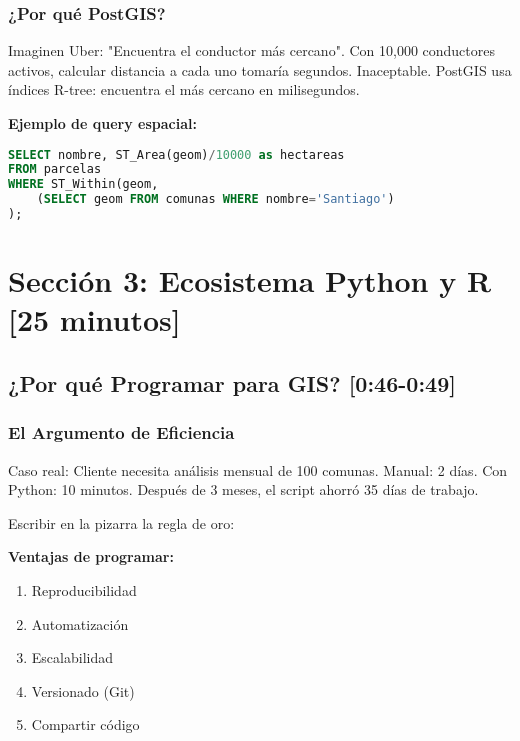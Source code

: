 \documentclass[11pt,a4paper]{article}
\newcommand{\tiempo}[1]{\textcolor{timecolor}{\textbf{[#1]}}}
\newcommand{\decir}[1]{\begin{tcolorbox}[colback=blue!5,colframe=usachblue,title={DECIR}]#1\end{tcolorbox}}
\newcommand{\hacer}[1]{\begin{tcolorbox}[colback=green!5,colframe=green!50!black,title={HACER}]#1\end{tcolorbox}}
\begin{document}
\subsubsection{¿Por qué PostGIS?}

\decir{Imaginen Uber: "Encuentra el conductor más cercano". Con 10,000 conductores activos, calcular distancia a cada uno tomaría segundos. Inaceptable. PostGIS usa índices R-tree: encuentra el más cercano en milisegundos.}

\textbf{Ejemplo de query espacial:}

\begin{lstlisting}[language=SQL]
SELECT nombre, ST_Area(geom)/10000 as hectareas
FROM parcelas
WHERE ST_Within(geom, 
    (SELECT geom FROM comunas WHERE nombre='Santiago')
);
\end{lstlisting}

\newpage

\section{Sección 3: Ecosistema Python y R \tiempo{25 minutos}}

\subsection{¿Por qué Programar para GIS? \tiempo{0:46-0:49}}

\subsubsection{El Argumento de Eficiencia}

\decir{Caso real: Cliente necesita análisis mensual de 100 comunas. Manual: 2 días. Con Python: 10 minutos. Después de 3 meses, el script ahorró 35 días de trabajo.}

\hacer{Escribir en la pizarra la regla de oro:}

\begin{center}
\end{center}

\textbf{Ventajas de programar:}
\begin{enumerate}
    \item Reproducibilidad
    \item Automatización
    \item Escalabilidad
    \item Versionado (Git)
    \item Compartir código
\end{enumerate}
\end{document}

